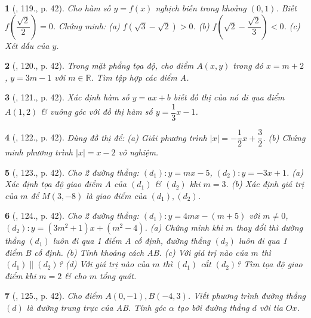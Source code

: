 \documentclass{article}
\newtheorem{baitoan}{}
\begin{document}
\begin{baitoan}[\cite{Tuyen_Toan_9_old}, 119., p. 42]
	Cho hàm số $y = f(x)$ nghịch biến trong khoảng $(0,1)$. Biết $f\left(\dfrac{\sqrt{2}}{2}\right) = 0$. Chứng minh: (a) $f(\sqrt{3} - \sqrt{2}) > 0$. (b) $f\left(\sqrt{2} - \dfrac{\sqrt{2}}{3}\right) < 0$. (c) Xét dấu của $y$.
\end{baitoan}

\begin{baitoan}[\cite{Tuyen_Toan_9_old}, 120., p. 42]
	Trong mặt phẳng tọa độ, cho điểm $A(x,y)$ trong đó $x = m + 2$, $y = 3m - 1$ với $m\in\mathbb{R}$. Tìm tập hợp các điểm A.
\end{baitoan}

\begin{baitoan}[\cite{Tuyen_Toan_9_old}, 121., p. 42]
	Xác định hàm số $y = ax + b$ biết đồ thị của nó đi qua điểm $A(1,2)$ \& vuông góc với đồ thị hàm số $y = \dfrac{1}{3}x - 1$.
\end{baitoan}

\begin{baitoan}[\cite{Tuyen_Toan_9_old}, 122., p. 42]
	Dùng đồ thị để: (a) Giải phương trình $|x| = -\dfrac{1}{2}x + \dfrac{3}{2}$. (b) Chứng minh phương trình $|x| = x - 2$ vô nghiệm.
\end{baitoan}

\begin{baitoan}[\cite{Tuyen_Toan_9_old}, 123., p. 42]
	Cho 2 đường thẳng: $(d_1): y = mx - 5$, $(d_2):y = -3x + 1$. (a) Xác định tọa độ giao điểm A của $(d_1)$ \& $(d_2)$ khi $m = 3$. (b) Xác định giá trị của $m$ để $M(3,-8)$ là giao điểm của $(d_1),(d_2)$.
\end{baitoan}

\begin{baitoan}[\cite{Tuyen_Toan_9_old}, 124., p. 42]
	Cho 2 đường thẳng: $(d_1):y = 4mx - (m + 5)$ với $m\ne0$, $(d_2):y = (3m^2 + 1)x + (m^2 - 4)$. (a) Chứng minh khi $m$ thay đổi thì đường thẳng $(d_1)$ luôn đi qua 1 điểm A cố định, đường thẳng $(d_2)$ luôn đi qua 1 điểm B cố định. (b) Tính khoảng cách AB. (c) Với giá trị nào của $m$ thì $(d_1)\parallel(d_2)$? (d) Với giá trị nào của $m$ thì $(d_1)$ cắt $(d_2)$? Tìm tọa độ giao điểm khi $m = 2$ \& cho $m$ tổng quát.
\end{baitoan}

\begin{baitoan}[\cite{Tuyen_Toan_9_old}, 125., p. 42]
	Cho điểm $A(0,-1),B(-4,3)$. Viết phương trình đường thẳng $(d)$ là đường trung trực của AB. Tính góc $\alpha$ tạo bởi đường thẳng $d$ với tia $Ox$.
\end{baitoan}


\printbibliography[heading=bibintoc]
	
\end{document}
